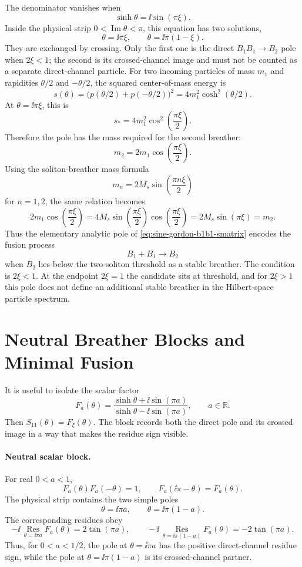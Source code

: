 The denominator vanishes when
\[
  \sinh\theta=\ii\sin(\pi\xi).
\]
Inside the physical strip \(0<\operatorname{Im}\theta<\pi\), this equation has
two solutions,
\[
  \theta=\ii\pi\xi,
  \qquad
  \theta=\ii\pi(1-\xi).
\]
They are exchanged by crossing.  Only the first one is the direct
\(B_1B_1\to B_2\) pole when \(2\xi<1\); the second is its crossed-channel
image and must not be counted as a separate direct-channel particle.
For two incoming particles of mass \(m_1\) and rapidities
\(\theta/2\) and \(-\theta/2\), the squared center-of-mass energy is
\[
  s(\theta)=
  \bigl(p(\theta/2)+p(-\theta/2)\bigr)^2
  =
  4m_1^2\cosh^2(\theta/2).
\]
At \(\theta=\ii\pi\xi\), this is
\[
  s_\ast
  =
  4m_1^2\cos^2\!\left(\frac{\pi\xi}{2}\right).
\]
Therefore the pole has the mass required for the second breather:
\[
  m_2=2m_1\cos\!\left(\frac{\pi\xi}{2}\right).
\]
Using the soliton-breather mass formula
\[
  m_n=2M_s\sin\!\left(\frac{\pi n\xi}{2}\right)
\]
for \(n=1,2\), the same relation becomes
\[
  2m_1\cos\!\left(\frac{\pi\xi}{2}\right)
  =
  4M_s\sin\!\left(\frac{\pi\xi}{2}\right)
      \cos\!\left(\frac{\pi\xi}{2}\right)
  =
  2M_s\sin(\pi\xi)
  =
  m_2 .
\]
Thus the elementary analytic pole of
\eqref{eq:sine-gordon-b1b1-smatrix} encodes the fusion process
\[
  B_1+B_1\longrightarrow B_2
\]
when \(B_2\) lies below the two-soliton threshold as a stable breather.  The
condition is \(2\xi<1\).  At the endpoint \(2\xi=1\) the candidate sits at
threshold, and for \(2\xi>1\) this pole does not define an additional stable
breather in the Hilbert-space particle spectrum.

\section{Neutral Breather Blocks and Minimal Fusion}

It is useful to isolate the scalar factor
\begin{equation}
  F_a(\theta)
  =
  \frac{\sinh\theta+\ii\sin(\pi a)}
       {\sinh\theta-\ii\sin(\pi a)} ,
  \qquad a\in\mathbb R .
  \label{eq:sine-gordon-neutral-block}
\end{equation}
Then \(S_{11}(\theta)=F_\xi(\theta)\).  The block records both the direct pole
and its crossed image in a way that makes the residue sign visible.

\paragraph{Neutral scalar block.}
For real \(0<a<1\),
\[
  F_a(\theta)F_a(-\theta)=1,
  \qquad
  F_a(\ii\pi-\theta)=F_a(\theta).
\]
The physical strip contains the two simple poles
\[
  \theta=\ii\pi a,
  \qquad
  \theta=\ii\pi(1-a).
\]
The corresponding residues obey
\[
  -\ii\,\operatorname*{Res}_{\theta=\ii\pi a}F_a(\theta)
  =
  2\tan(\pi a),
  \qquad
  -\ii\,\operatorname*{Res}_{\theta=\ii\pi(1-a)}F_a(\theta)
  =
  -2\tan(\pi a).
\]
Thus, for \(0<a<1/2\), the pole at \(\theta=\ii\pi a\) has the positive
direct-channel residue sign, while the pole at \(\theta=\ii\pi(1-a)\) is its
crossed-channel partner.

